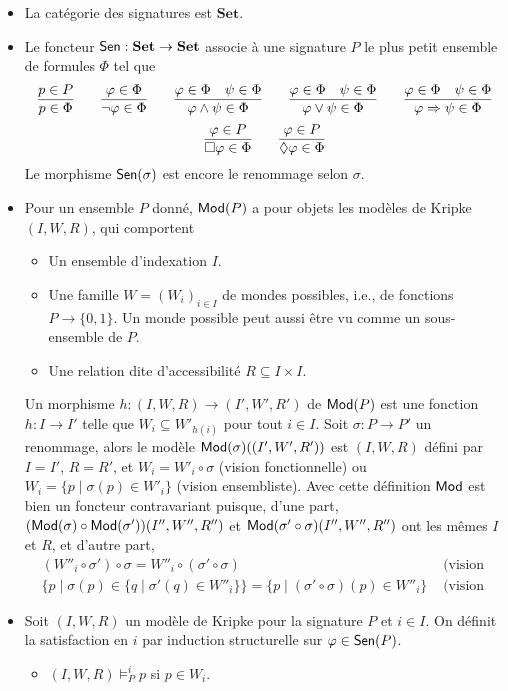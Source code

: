 \documentclass[11pt,a4paper]{article}
\newcommand{\ph}{\varphi}
\newcommand{\itemz}{\item[$\triangleright$]}
\newcommand{\gr}{\textbf}
\newcommand{\info}[1]{\text{{\fontfamily{lmss}\selectfont #1}}}
\newcommand{\Mod}{\info{Mod}}
\newcommand{\Sen}{\info{Sen}}
\begin{document}
\begin{itemize}
\itemz La catégorie des signatures est $\gr{Set}$.
\itemz Le foncteur $\Sen : \gr{Set} \to \gr{Set}$ associe à une signature $P$ le plus petit ensemble de formules $\Phi$ tel que
$$
\infer{p \in \Phi}{p \in P}
\qquad
\infer{\neg \ph \in \Phi}{\ph \in \Phi}
\qquad
\infer{\ph \wedge \psi \in \Phi}{\ph \in \Phi & \psi \in \Phi }
\qquad
\infer{\ph \vee \psi \in \Phi}{\ph \in \Phi & \psi \in \Phi }
\qquad
\infer{\ph \Rightarrow \psi \in \Phi}{\ph \in \Phi & \psi \in \Phi }
$$
$$
\infer{\square \ph \in \Phi}{\ph \in P}
\qquad
\infer{\lozenge \ph \in \Phi}{\ph \in P}
$$
Le morphisme $\Sen(\sigma)$ est encore le renommage selon $\sigma$.
\itemz Pour un ensemble $P$ donné, $\Mod(P)$ a pour objets les modèles de Kripke $(I,W,R)$, qui comportent
\begin{itemize}
\setlength\itemsep{-0.3em}
\item Un ensemble d'indexation $I$.
\item Une famille $W = (W_i)_{i\in I}$ de mondes possibles, i.e., de fonctions $P \to \{ 0,1 \}$. Un monde possible peut aussi être vu comme un sous-ensemble de $P$.
\item Une relation dite d'accessibilité $R \subseteq I \times I$.
\end{itemize}
Un morphisme $h : (I,W,R) \to (I',W',R')$ de $\Mod(P)$ est une fonction $h : I \to I'$ telle que $W_i \subseteq W'_{h(i)}$ pour tout $i \in I$. Soit $\sigma : P \to P'$ un renommage, alors le modèle $\Mod(\sigma)((I',W',R'))$ est $(I,W,R)$ défini par $I = I'$, $R = R'$, et $W_i = W'_i \circ \sigma$ (vision fonctionnelle) ou $W_i = \{ p \mid \sigma(p) \in W'_i \}$ (vision ensembliste). Avec cette définition $\Mod$ est bien un foncteur contravariant puisque, d'une part, $(\Mod(\sigma) \circ \Mod(\sigma')) (I'',W'',R'')$ et $\Mod(\sigma' \circ \sigma)(I'',W'',R'')$ ont les mêmes $I$ et $R$, et d'autre part,
\begin{align*}
&(W''_i \circ \sigma') \circ \sigma = W''_i \circ (\sigma' \circ \sigma) &\text{ (vision fonctionnelle)}\\
&  \{ p \mid \sigma(p) \in \{ q \mid \sigma'(q) \in W''_i \}\} = \{ p \mid (\sigma' \circ \sigma)(p) \in W''_i \} & \text{ (vision ensembliste)}
\end{align*}
\itemz Soit $(I,W,R)$ un modèle de Kripke pour la signature $P$ et $i \in I$. On définit la satisfaction en $i$ par induction structurelle sur $\ph \in \Sen(P)$.
\begin{itemize}
\setlength\itemsep{-0.3em}
\item $(I,W,R) \models^i_P p$ si $p \in W_i$.

\end{itemize}
\end{itemize}
\end{document}
